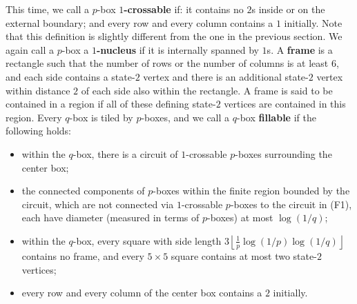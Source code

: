 \documentclass{article}
\newcommand{\floor}[1]{\left\lfloor#1\right \rfloor}
\numberwithin{equation}{section}
\begin{document}
This time, we call a $p$-box \textbf{$1$-crossable} if: it contains no $2$s inside or on the external boundary; and every row and every column contains a $1$ initially. 
Note that this definition is slightly different from the one in the previous section.
We again call a $p$-box a \textbf{$1$-nucleus} if it is internally spanned by $1$s. 
A \textbf{frame} is a rectangle such that the number of rows or the number of columns is at least $6$, and each side contains a state-$2$ vertex and there is an additional state-$2$ vertex within distance $2$ of each side also within the rectangle.
A frame is said to be contained in a region if all of these defining state-$2$ vertices are contained in this region.
Every $q$-box is tiled by $p$-boxes, and we call a $q$-box \textbf{fillable} if the following holds:
\begin{itemize}
    \item[(F1)] 
    within the $q$-box, there is a circuit of $1$-crossable $p$-boxes surrounding the center box;
    \item[(F2)] 
    the connected components of $p$-boxes within the finite region bounded by the circuit, which are not connected via $1$-crossable $p$-boxes to the circuit in (F1), each have diameter (measured in terms of $p$-boxes) at most $\log(1/q)$;
    \item[(F3)] 
    within the $q$-box, every square with side length $3\floor{\frac{1}{p}\log(1/p)\log(1/q)}$ contains no frame, and every $5 \times 5$ square contains at most two state-$2$ vertices;
    \item[(F4)] 
    every row and every column of the center box contains a $2$ initially.
\end{itemize}
\end{document}

